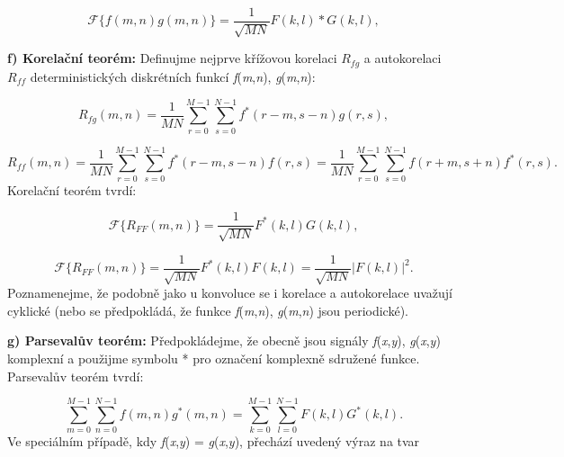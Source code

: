\begin{equation} \label{eq:2_53b}
    \mathscr{F}\{ f(m, n) g(m, n) \} = \frac{1}{\sqrt{MN}} F(k, l) * G(k, l),
\end{equation}

\noindent \textbf{f) Korelační teorém: }Definujme nejprve křížovou korelaci $R_{fg}$ a autokorelaci $R_{ff}$ deterministických diskrétních funkcí \textit{f}(\textit{m},\textit{n}), \textit{g}(\textit{m},\textit{n}):

\begin{equation} \label{eq:2_54}
    R_{fg}(m, n) = \frac{1}{MN} \sum\limits_{r=0}^{M-1} \sum\limits_{s=0}^{N-1} f^*(r - m, s - n) g(r, s),
\end{equation}

\begin{equation} \label{eq:2_55}
    R_{ff}(m, n) = \frac{1}{MN} \sum\limits_{r=0}^{M-1} \sum\limits_{s=0}^{N-1} f^*(r - m, s - n) f(r, s) = \frac{1}{MN} \sum\limits_{r=0}^{M-1} \sum\limits_{s=0}^{N-1} f(r + m, s + n) f^*(r, s).
\end{equation}
Korelační teorém tvrdí:

\begin{equation} \label{eq:2_56}
    \mathscr{F}\{ R_{FF}(m, n) \} = \frac{1}{\sqrt{MN}} F^*(k, l) G(k, l),
\end{equation}

\begin{equation} \label{eq:2_57}
    \mathscr{F}\{ R_{FF}(m, n) \} = \frac{1}{\sqrt{MN}} F^*(k, l) F(k, l) = \frac{1}{\sqrt{MN}} |F(k, l)|^2.
\end{equation}
Poznamenejme, že podobně jako u konvoluce se i korelace a autokorelace uvažují cyklické (nebo se předpokládá, že funkce \textit{f}(\textit{m},\textit{n}), \textit{g}(\textit{m},\textit{n}) jsou periodické).

\noindent \textbf{g) Parsevalův teorém: }Předpokládejme, že obecně jsou signály \textit{f}(\textit{x},\textit{y}), \textit{g}(\textit{x},\textit{y}) komplexní a použijme symbolu * pro označení komplexně sdružené funkce. Parsevalův teorém tvrdí:

\begin{equation} \label{eq:2_58}
    \sum\limits_{m=0}^{M-1} \sum\limits_{n=0}^{N-1} f(m, n) g^*(m, n) = \sum\limits_{k=0}^{M-1} \sum\limits_{l=0}^{N-1} F(k, l)G^*(k, l).
\end{equation}
Ve speciálním případě, kdy  \textit{f}(\textit{x},\textit{y}) = \textit{g}(\textit{x},\textit{y}), přechází uvedený výraz na tvar

